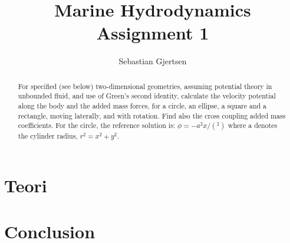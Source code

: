 \documentclass{article}
\begin{document}
\title{Marine Hydrodynamics \\ Assignment 1}
\author{Sebastian Gjertsen}

\maketitle

\begin{abstract}
For specified (see below) two-dimensional geometries, assuming potential theory in unbounded fluid, and use of Green's second identity, calculate the velocity potential along the body and the added mass forces, for a circle, an ellipse, a square and a rectangle, moving laterally, and with rotation. Find also the cross coupling added mass coefficients. For the circle, the reference solution is: $ \phi =-a^2x/(^2)$ where a denotes the cylinder radius, $r^2=x^2+y^2$.
\end{abstract}


\section{Teori}









\section{Conclusion}
\end{document}

